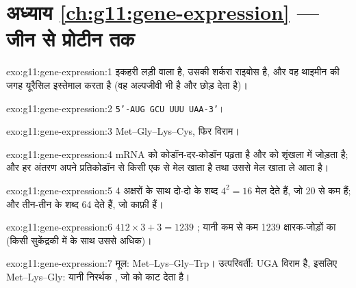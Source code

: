 \section*{अध्याय \ref{ch:g11:gene-expression} --- जीन से प्रोटीन तक}

\begin{solution}{exo:g11:gene-expression:1}
 इकहरी लड़ी वाला है, उसकी शर्करा राइबोस है, और वह थाइमीन की जगह यूरैसिल
इस्तेमाल करता है (वह अल्पजीवी भी है और  छोड़ देता है)।
\end{solution}

\begin{solution}{exo:g11:gene-expression:2}
\texttt{5'-AUG GCU UUU UAA-3'}।
\end{solution}

\begin{solution}{exo:g11:gene-expression:3}
Met--Gly--Lys--Cys, फिर विराम।
\end{solution}

\begin{solution}{exo:g11:gene-expression:4}
 mRNA को कोडॉन-दर-कोडॉन पढ़ता है और  को शृंखला में
जोड़ता है; और हर अंतरण  अपने प्रतिकोडॉन से किसी एक  से मेल खाता है
तथा उससे मेल खाता  ले आता है।
\end{solution}

\begin{solution}{exo:g11:gene-expression:5}
4 अक्षरों के साथ दो-दो के शब्द $4^2 = 16$ मेल देते हैं, जो 20 
से कम हैं; और तीन-तीन के शब्द 64 देते हैं, जो काफ़ी हैं।
\end{solution}

\begin{solution}{exo:g11:gene-expression:6}
$412 \times 3 + 3 = 1239$ ; यानी कम से कम 1239 क्षारक-जोड़ों
का  (किसी सुकेंद्रकी में  के साथ उससे अधिक)।
\end{solution}

\begin{solution}{exo:g11:gene-expression:7}
मूल: Met--Lys--Gly--Trp। उत्परिवर्ती: UGA विराम है, इसलिए Met--Lys--Gly:
यानी निरर्थक , जो  को काट देता है।
\end{solution}


